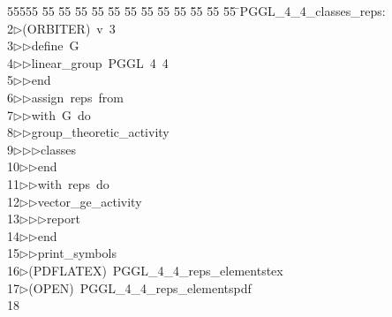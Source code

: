 %
%
\begin{tabbing}
55555 \= 55 \= 55 \= 55 \= 55 \= 55 \= 55 \= 55 \= 55 \= 55 \= 55 \= 55 \= 55 \= \>PGGL\_4\_4\_classes\_reps:\\[0pt]
2\>$\triangleright$\>(ORBITER)\ v\ 3\ \\[0pt]
3\>$\triangleright$\>$\triangleright$\>define\ G\ \\[0pt]
4\>$\triangleright$\>$\triangleright$\>linear\_group\ PGGL\ 4\ 4\ \\[0pt]
5\>$\triangleright$\>$\triangleright$\>end\ \\[0pt]
6\>$\triangleright$\>$\triangleright$\>assign\ reps\ from\ \\[0pt]
7\>$\triangleright$\>$\triangleright$\>with\ G\ do\ \\[0pt]
8\>$\triangleright$\>$\triangleright$\>group\_theoretic\_activity\ \\[0pt]
9\>$\triangleright$\>$\triangleright$\>$\triangleright$\>classes\ \\[0pt]
10\>$\triangleright$\>$\triangleright$\>end\ \\[0pt]
11\>$\triangleright$\>$\triangleright$\>with\ reps\ do\ \\[0pt]
12\>$\triangleright$\>$\triangleright$\>vector\_ge\_activity\ \\[0pt]
13\>$\triangleright$\>$\triangleright$\>$\triangleright$\>report\ \\[0pt]
14\>$\triangleright$\>$\triangleright$\>end\ \\[0pt]
15\>$\triangleright$\>$\triangleright$\>print\_symbols\\[0pt]
16\>$\triangleright$\>(PDFLATEX)\ PGGL\_4\_4\_reps\_elementstex\\[0pt]
17\>$\triangleright$\>(OPEN)\ PGGL\_4\_4\_reps\_elementspdf\\[0pt]
18\>\end{tabbing}
